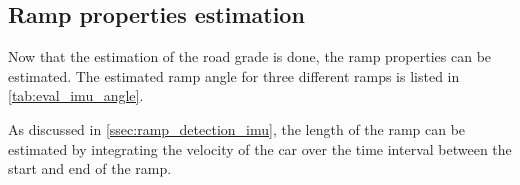 \subsection{Ramp properties estimation}
Now that the estimation of the road grade is done, the ramp properties can be estimated.
The estimated ramp angle for three different ramps is listed in \cref{tab:eval_imu_angle}.
\begin{table}[htb]
	\centering
	\caption{Estimation of ramp angle.}
	\label{tab:eval_imu_angle}
\end{table}
As discussed in \cref{ssec:ramp_detection_imu}, the length of the ramp can be estimated by integrating the velocity of the car over the time interval between the start and end of the ramp.
